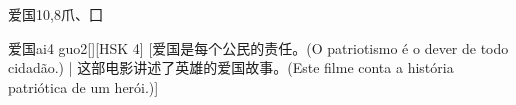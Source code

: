 \begin{entry}{爱国}{10,8}{⽖、⼞}
  \begin{phonetics}{爱国}{ai4 guo2}[][HSK 4]
    [爱国是每个公民的责任。(O patriotismo é o dever de todo cidadão.) | 这部电影讲述了英雄的爱国故事。(Este filme conta a história patriótica de um herói.)]
  \end{phonetics}
\end{entry}
